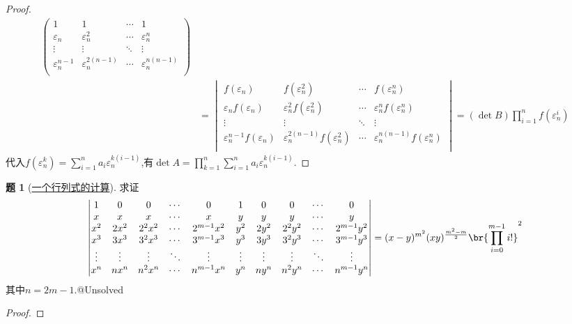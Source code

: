 \documentclass{article}
\theoremstyle{definition}
\newtheorem{exercise}{题}[section]
\begin{document}
\begin{proof}
$$\begin{aligned}
\begin{pmatrix}
        1&1&\cdots&1\\
        \varepsilon_n&\varepsilon_n^2&\cdots&\varepsilon_n^n\\
        \vdots&\vdots&\ddots&\vdots\\
        \varepsilon_n^{n-1}&\varepsilon_n^{2(n-1)}&\cdots&\varepsilon_n^{n(n-1)}\\
    \end{pmatrix}\\
    &=\begin{vmatrix}
        f(\varepsilon_n)&f(\varepsilon_n^2)&\cdots&f(\varepsilon_n^n)\\
        \varepsilon_nf(\varepsilon_n)&\varepsilon_n^2f(\varepsilon_n^2)&\cdots&\varepsilon_n^nf(\varepsilon_n^n)\\
        \vdots&\vdots&\ddots&\vdots\\
        \varepsilon_n^{n-1}f(\varepsilon_n)&\varepsilon_n^{2(n-1)}f(\varepsilon_n^2)&\cdots&\varepsilon_n^{n(n-1)}f(\varepsilon_n^n)\\
    \end{vmatrix}=(\det B)\prod_{i=1}^n f(\varepsilon_n^i)
    \end{aligned}$$
    代入$f(\varepsilon_n^k)=\sum_{i=1}^n a_i\varepsilon_n^{k(i-1)}$,有$\det A=\prod_{k=1}^n\sum_{i=1}^n a_i\varepsilon_n^{k(i-1)}$.
\end{proof}

\begin{exercise}[\href{https://chaoli.club/index.php/6920}{一个行列式的计算}]
    求证
    $$\begin{vmatrix}
    1 & 0 & 0 & \cdots & 0 & 1 & 0 & 0 & \cdots & 0 \\
    x & x & x & \cdots & x & y & y & y & \cdots & y \\
    x^{2} & 2 x^{2} & 2^{2} x^{2} & \cdots & 2^{m-1} x^{2} & y^{2} & 2 y^{2} & 2^{2} y^{2} & \cdots & 2^{m-1} y^{2} \\
    x^{3} & 3 x^{3} & 3^{2} x^{3} & \cdots & 3^{m-1} x^{3} & y^{3} & 3 y^{3} & 3^{2} y^{3} & \cdots & 3^{m-1} y^{3} \\
    \vdots & \vdots & \vdots & \ddots & \vdots & \vdots & \vdots & \vdots & \ddots & \vdots \\
    x^{n} & n x^{n} & n^{2} x^{n} & \cdots & n^{m-1} x^{n} & y^{n} & n y^{n} & n^{2} y^{n} & \cdots & n^{m-1} y^{n}
    \end{vmatrix}
    =(x-y)^{m^{2}}(x y)^{\frac{m^{2}-m}{2}}\br{\prod_{i=0}^{m-1} i !}^{2}$$
    其中$n=2m-1$.@Unsolved
\end{exercise}
\begin{proof}
    
\end{proof}
\end{document}
